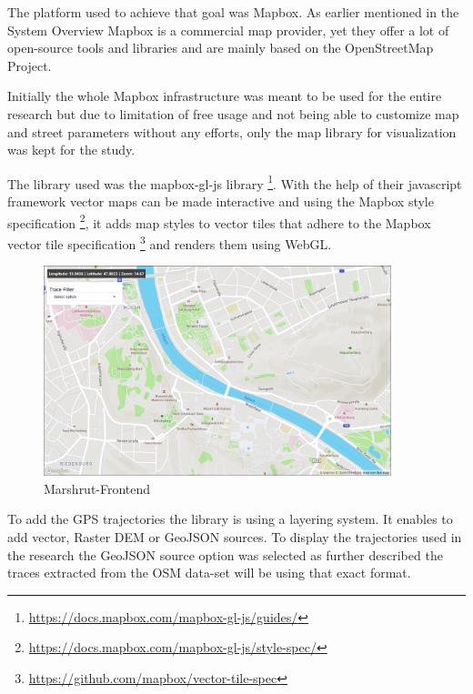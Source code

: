The platform used to achieve that goal was Mapbox. As earlier mentioned in the System Overview Mapbox is a commercial map provider, yet they offer a lot of open-source tools and libraries and are mainly based on the OpenStreetMap Project.

Initially the whole Mapbox infrastructure was meant to be used for the entire research but due to limitation of free usage and not being able to customize map and street parameters without any efforts, only the map library for visualization was kept for the study.

The library used was the mapbox-gl-js library \footnote{\url{https://docs.mapbox.com/mapbox-gl-js/guides/}}. With the help of their javascript framework vector maps can be made interactive and using the Mapbox style specification \footnote{\url{https://docs.mapbox.com/mapbox-gl-js/style-spec/}}, it adds map styles to vector tiles that adhere to the Mapbox vector tile specification \footnote{\url{https://github.com/mapbox/vector-tile-spec}} and renders them using WebGL. 

\begin{figure}[!ht]
  \centering
  \includegraphics[width=0.9\textwidth]{images/MapApplicationWithout.png}
  \caption{
  Marshrut-Frontend
  }
  \label{figure:MarshrutFrontend}
\end{figure}

To add the GPS trajectories the library is using a layering system. It enables to add vector, Raster DEM or GeoJSON sources. To display the trajectories used in the research the GeoJSON source option was selected as further described the traces extracted from the OSM data-set will be using that exact format. 

